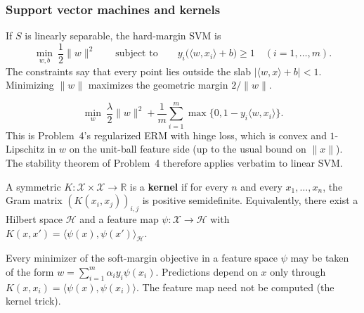 \subsubsection{Support vector machines and kernels}
\label{subsubsec:mlu-svm}

\begin{definition}
\label{def:mlu-hard-svm}
If $S$ is linearly separable, the hard-margin SVM is
\[
\min_{w,b}\ \frac12\lVert w\rVert^2
\qquad\text{subject to}\qquad
y_i\bigl(\langle w,x_i\rangle+b\bigr)\ge 1
\quad(i=1,\dots,m).
\]
The constraints say that every point lies outside the slab $\lvert\langle w,x\rangle+b\rvert<1$. Minimizing $\lVert w\rVert$ maximizes the geometric margin $2/\lVert w\rVert$.
\end{definition}

\begin{definition}
\label{def:mlu-soft-svm}
\[
\min_{w}\
\frac{\lambda}{2}\lVert w\rVert^2
+
\frac1m\sum_{i=1}^m\max\bigl\{0,1-y_i\langle w,x_i\rangle\bigr\}.
\]
This is Problem~4's regularized ERM with hinge loss, which is convex and $1$-Lipschitz in $w$ on the unit-ball feature side (up to the usual bound on $\lVert x\rVert$). The stability theorem of Problem~4 therefore applies verbatim to linear SVM.
\end{definition}

\begin{definition}
\label{def:mlu-kernel}
A symmetric $K:\mathcal{X}\times\mathcal{X}\to\mathbb{R}$ is a \textbf{kernel} if for every $n$ and every $x_1,\dots,x_n$, the Gram matrix $(K(x_i,x_j))_{i,j}$ is positive semidefinite. Equivalently, there exist a Hilbert space $\mathcal{H}$ and a feature map $\psi:\mathcal{X}\to\mathcal{H}$ with $K(x,x')=\langle\psi(x),\psi(x')\rangle_{\mathcal{H}}$.
\end{definition}

\begin{theorem}
\label{thm:mlu-representer}
Every minimizer of the soft-margin objective in a feature space $\psi$ may be taken of the form $w=\sum_{i=1}^m\alpha_i y_i\psi(x_i)$. Predictions depend on $x$ only through $K(x,x_i)=\langle\psi(x),\psi(x_i)\rangle$. The feature map need not be computed (the kernel trick).
\end{theorem}


